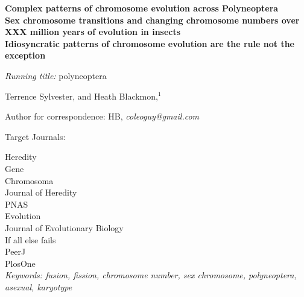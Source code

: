 \documentclass[12pt]{article}
\begin{document}
\linenumbers

\begin{center}
\textbf{Complex patterns of chromosome evolution across Polyneoptera}\\
\vspace{.5cm}
\textbf{Sex chromosome transitions and changing chromosome numbers over XXX million years of evolution in insects}\\
\vspace{.5cm}
\textbf{Idiosyncratic patterns of chromosome evolution are the rule not the exception}
\end{center}

\vfill
\noindent
\textit{Running title:} polyneoptera


\vfill
\noindent
Terrence Sylvester,
%
\noindent
and
Heath Blackmon,$^1$
\vfill


\theendnotes
\noindent
Author for correspondence: HB, \textit{coleoguy@gmail.com}
\vfill

\clearpage

 
\bigskip
\noindent

\noindent 
Target Journals:

\noindent 
Heredity\\
Gene\\
Chromosoma\\
Journal of Heredity\\
PNAS\\
Evolution\\
Journal of Evolutionary Biology\\

\noindent 
If all else fails \\
PeerJ\\
PlosOne\\

\noindent
\textit{Keywords: fusion, fission, chromosome number, sex chromosome, polyneoptera, asexual, karyotype}


\clearpage




\end{document}
